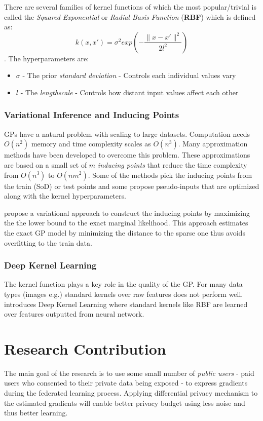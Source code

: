 \documentclass[fourier]{_style/dissertation}
\begin{document}
There are several families of kernel functions of which the most popular/trivial is called the \textit{Squared Exponential} or \textit{Radial Basis Function} (\textbf{RBF}) which is defined as: \\
$$k(x,x')=\sigma^{2} exp(-\frac{\lVert x-x' \rVert ^{2}}{2l^{2}})$$. The hyperparameters are: \\
\begin{itemize}
    \item $\sigma$ - The prior \textit{standard deviation} - Controls each individual values vary
    \item $l$ - The \textit{lengthscale} - Controls how distant input values affect each other
\end{itemize}

\subsection{Variational Inference and Inducing Points}
GPs have a natural problem with scaling to large datasets. Computation needs $O(n^{2})$ memory and   time complexity scales as $O(n^{3})$. Many approximation methods have been developed to overcome this problem. These approximations are based on a small set of $m$ \textit{inducing points} that reduce the time complexity from $O(n^{3})$ to $O(nm^{2})$. Some of the methods pick the inducing points from the train (SoD) or test points and some propose pseudo-inputs that are optimized along with the kernel hyperparameters. 

\cite{pmlr-v5-titsias09a} propose a variational approach to construct the inducing points by maximizing the the lower bound to the exact marginal likelihood. This approach estimates the exact GP model by minimizing the distance to the sparse one  thus avoids overfitting to the train data.

\subsection{Deep Kernel Learning}
The kernel function plays a key role in the quality of the GP. For many data types (images e.g.) standard kernels over raw features does not perform well. \cite{Wilson2015DeepLearning} introduces Deep Kernel Learning where standard kernels like RBF are learned over features outputted from neural network.


\chapter{Research Contribution}
The main goal of the research is to use some small number of \textit{public users} - paid users who consented to their private data being exposed - to express gradients during the federated learning process. Applying differential privacy mechanism to the estimated gradients will enable better privacy budget using less noise and thus better learning.
\end{document}
